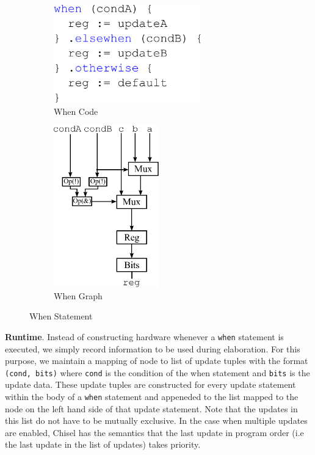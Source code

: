 \begin{figure}[htb]
\centering
  \begin{subfigure}[t]{0.48\textwidth}
  \centering
  \includegraphics[width=0.7\textwidth]{figures/when.pdf}
  \caption{When Code}
  \label{fig:whenscala}
  \end{subfigure}
  \hfill
  \begin{subfigure}[t]{0.48\textwidth}
  \centering
  \includegraphics[width=0.5\textwidth]{figures/whengraph.pdf}
  \caption{When Graph}
  \label{fig:whenelab}
  \end{subfigure}
\caption{When Statement}
\label{fig:when}
\end{figure}

{\bf Runtime}. Instead of constructing hardware whenever a {\tt when}
statement is executed, we simply record information to be used during
elaboration. For this purpose, we maintain a mapping of node to list
of update tuples with the format {\tt (cond, bits)} where {\tt cond}
is the condition of the when statement and {\tt bits} is the update
data. These update tuples are constructed for every update statement
within the body of a {\tt when} statement and appeneded to the list
mapped to the node on the left hand side of that update
statement. Note that the updates in this list do not have to be
mutually exclusive. In the case when multiple updates are enabled,
Chisel has the semantics that the last update in program order (i.e
the last update in the list of updates) takes priority.

